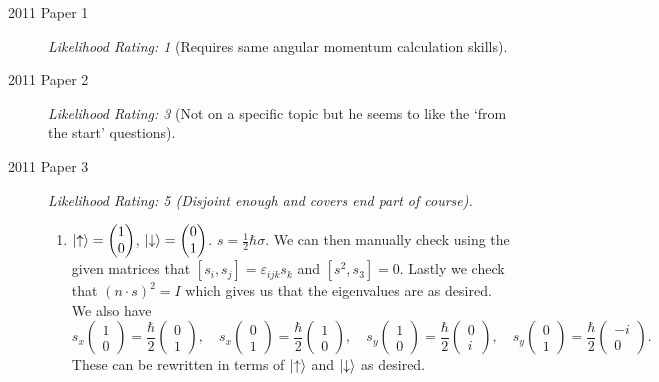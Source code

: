 \documentclass[a4paper]{scrartcl}
\begin{document}
\begin{description}
    \item [2011 Paper 1] \emph{Likelihood Rating: 1} (Requires same angular momentum calculation skills).
    \item [2011 Paper 2] \emph{Likelihood Rating: 3} (Not on a specific topic but he seems to like the `from the start' questions).
    \item [2011 Paper 3] \emph{Likelihood Rating: 5 {\color{gray}(Disjoint enough and covers end part of course).}}

\begin{enumerate}[label=(\roman*)]
    \item $\ket{\uparrow} = \begin{pmatrix}
        1 \\ 0
    \end{pmatrix}$, $\ket{\downarrow} = \begin{pmatrix}
        0 \\ 1
    \end{pmatrix}$. $s = \frac{1}{2} \hbar \sigma$. We can then manually check using the given matrices that $[s_i, s_j] = \varepsilon_{ijk} s_k$ and $[s^2, s_3] = 0$. Lastly we check that $(n \cdot s)^2 = I$ which gives us that the eigenvalues are as desired. We also have
    $$
    s_x\begin{pmatrix}
        1 \\ 0
    \end{pmatrix} = \frac{\hbar}{2}\begin{pmatrix}
        0 \\ 1
    \end{pmatrix}, \quad 
    s_x\begin{pmatrix}
        0 \\ 1
    \end{pmatrix} = \frac{\hbar}{2}\begin{pmatrix}
        1 \\ 0
    \end{pmatrix}, \quad 
    s_y\begin{pmatrix}
        1 \\ 0
    \end{pmatrix} = \frac{\hbar}{2}\begin{pmatrix}
        0 \\ i
    \end{pmatrix}, \quad 
    s_y\begin{pmatrix}
        0 \\ 1
    \end{pmatrix} = \frac{\hbar}{2}\begin{pmatrix}
        -i \\ 0
    \end{pmatrix}.
    $$
    These can be rewritten in terms of $\ket{\uparrow}$ and $\ket{\downarrow}$ as desired.


\end{enumerate}
\end{description}
\end{document}
